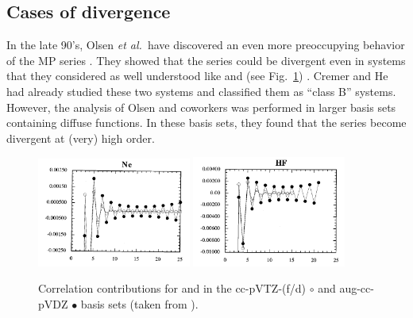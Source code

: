 \documentclass[11pt,a4paper]{article}
\begin{document}
\subsection{Cases of divergence}

In the late 90's, Olsen \textit{et al.}~have discovered an even more preoccupying behavior of the MP series \cite{}. They showed that the series could be divergent even in systems that they considered as well understood like  and  (see Fig.~\ref{fig:NeHFDiv}) \cite{Olsen_1996, Christiansen_1996}. Cremer and He had already studied these two systems and classified them as ``class B'' systems. However, the analysis of Olsen and coworkers was performed in larger basis sets containing diffuse functions. In these basis sets, they found that the series become divergent at (very) high order.

\begin{figure}[h!]
    \centering
    \includegraphics[width=0.45\textwidth]{Nedivergence.png}
    \includegraphics[width=0.45\textwidth]{HFdivergence.png}
    \caption{\centering Correlation contributions for  and  in the cc-pVTZ-(f/d) $\circ$ and aug-cc-pVDZ $\bullet$ basis sets (taken from \cite{Olsen_1996}).}
    \label{fig:NeHFDiv}
\end{figure}
\end{document}
